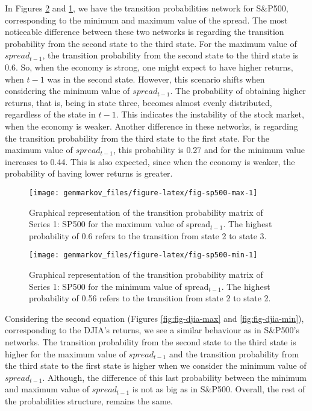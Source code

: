 In Figures \ref{fig:fig-sp500-min} and \ref{fig:fig-sp500-max}, we have the transition probabilities network for S\&P500, corresponding to the minimum and maximum value of the spread. The most noticeable difference between these two networks is regarding the transition probability from the second state to the third state. For the maximum value of \(spread_{t-1}\), the transition probability from the second state to the third state is 0.6. So, when the economy is strong, one might expect to have higher returns, when \(t-1\) was in the second state. However, this scenario shifts when considering the minimum value of \(spread_{t-1}\). The probability of obtaining higher returns, that is, being in state three, becomes almost evenly distributed, regardless of the state in \(t-1\). This indicates the instability of the stock market, when the economy is weaker. Another difference in these networks, is regarding the transition probability from the third state to the first state. For the maximum value of \(spread_{t-1}\), this probability is 0.27 and for the minimum value increases to 0.44. This is also expected, since when the economy is weaker, the probability of having lower returns is greater.

\begin{figure}

{\centering \texttt{[image: genmarkov\_files/figure-latex/fig-sp500-max-1]} 

}

\caption{Graphical representation of the transition probability matrix of Series 1: SP500 for the maximum value of spread$_{t-1}$. The highest probability of 0.6 refers to the transition from state 2 to state 3.}\label{fig:fig-sp500-max}
\end{figure}

\begin{figure}

{\centering \texttt{[image: genmarkov\_files/figure-latex/fig-sp500-min-1]} 

}

\caption{Graphical representation of the transition probability matrix of Series 1: SP500 for the minimum value of spread$_{t-1}$. The highest probability of 0.56 refers to the transition from state 2 to state 2.}\label{fig:fig-sp500-min}
\end{figure}

Considering the second equation (Figures \ref{fig:fig-djia-max} and \ref{fig:fig-djia-min}), corresponding to the DJIA's returns, we see a similar behaviour as in S\&P500's networks. The transition probability from the second state to the third state is higher for the maximum value of \(spread_{t-1}\) and the transition probability from the third state to the first state is higher when we consider the minimum value of \(spread_{t-1}\). Although, the difference of this last probability between the minimum and maximum value of \(spread_{t-1}\) is not as big as in S\&P500. Overall, the rest of the probabilities structure, remains the same.

